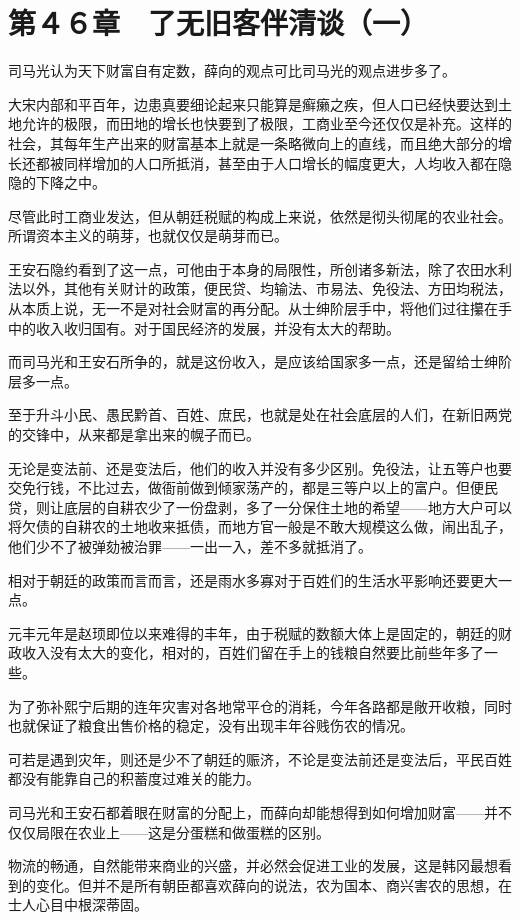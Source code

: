 \section{第４６章　了无旧客伴清谈（一）}

司马光认为天下财富自有定数，薛向的观点可比司马光的观点进步多了。

大宋内部和平百年，边患真要细论起来只能算是癣癞之疾，但人口已经快要达到土地允许的极限，而田地的增长也快要到了极限，工商业至今还仅仅是补充。这样的社会，其每年生产出来的财富基本上就是一条略微向上的直线，而且绝大部分的增长还都被同样增加的人口所抵消，甚至由于人口增长的幅度更大，人均收入都在隐隐的下降之中。

尽管此时工商业发达，但从朝廷税赋的构成上来说，依然是彻头彻尾的农业社会。所谓资本主义的萌芽，也就仅仅是萌芽而已。

王安石隐约看到了这一点，可他由于本身的局限性，所创诸多新法，除了农田水利法以外，其他有关财计的政策，便民贷、均输法、市易法、免役法、方田均税法，从本质上说，无一不是对社会财富的再分配。从士绅阶层手中，将他们过往攥在手中的收入收归国有。对于国民经济的发展，并没有太大的帮助。

而司马光和王安石所争的，就是这份收入，是应该给国家多一点，还是留给士绅阶层多一点。

至于升斗小民、愚民黔首、百姓、庶民，也就是处在社会底层的人们，在新旧两党的交锋中，从来都是拿出来的幌子而已。

无论是变法前、还是变法后，他们的收入并没有多少区别。免役法，让五等户也要交免行钱，不比过去，做衙前做到倾家荡产的，都是三等户以上的富户。但便民贷，则让底层的自耕农少了一份盘剥，多了一分保住土地的希望——地方大户可以将欠债的自耕农的土地收来抵债，而地方官一般是不敢大规模这么做，闹出乱子，他们少不了被弹劾被治罪——一出一入，差不多就抵消了。

相对于朝廷的政策而言而言，还是雨水多寡对于百姓们的生活水平影响还要更大一点。

元丰元年是赵顼即位以来难得的丰年，由于税赋的数额大体上是固定的，朝廷的财政收入没有太大的变化，相对的，百姓们留在手上的钱粮自然要比前些年多了一些。

为了弥补熙宁后期的连年灾害对各地常平仓的消耗，今年各路都是敞开收粮，同时也就保证了粮食出售价格的稳定，没有出现丰年谷贱伤农的情况。

可若是遇到灾年，则还是少不了朝廷的赈济，不论是变法前还是变法后，平民百姓都没有能靠自己的积蓄度过难关的能力。

司马光和王安石都着眼在财富的分配上，而薛向却能想得到如何增加财富——并不仅仅局限在农业上——这是分蛋糕和做蛋糕的区别。

物流的畅通，自然能带来商业的兴盛，并必然会促进工业的发展，这是韩冈最想看到的变化。但并不是所有朝臣都喜欢薛向的说法，农为国本、商兴害农的思想，在士人心目中根深蒂固。

